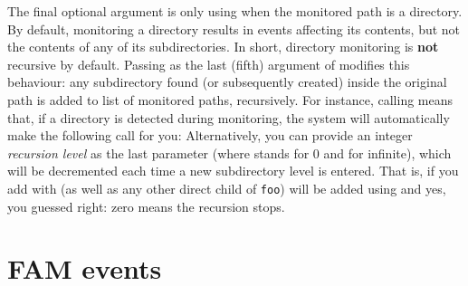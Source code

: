 The final optional argument is only using when the monitored path is a
directory. By default, monitoring a directory results in events
affecting its contents, but not the contents of any of its
subdirectories. In short, directory monitoring is \textbf{not}
recursive by default. Passing  as the last (fifth) argument of
 modifies this behaviour: any subdirectory
found (or subsequently created) inside the original path is added to
list of monitored paths, recursively. For instance,
calling
means that, if a directory  is detected during
monitoring, the system will automatically make the following call for
you:
Alternatively, you can provide an integer \textit{recursion level} as
the last parameter (where  stands for 0 and  for
infinite), which will be decremented each time a new subdirectory
level is entered. That is, if you add  with
 (as well as any other direct child of
\texttt{foo}) will be added using
and yes, you guessed right: zero means the recursion stops.

\section{FAM events}
\label{sec:fam-events}



